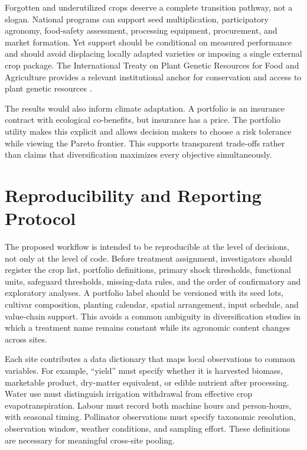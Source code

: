 \documentclass[conference]{IEEEtran}
\begin{document}
Forgotten and underutilized crops deserve a complete transition pathway, not a slogan. National programs can support seed multiplication, participatory agronomy, food-safety assessment, processing equipment, procurement, and market formation. Yet support should be conditional on measured performance and should avoid displacing locally adapted varieties or imposing a single external crop package. The International Treaty on Plant Genetic Resources for Food and Agriculture provides a relevant institutional anchor for conservation and access to plant genetic resources \cite{fao_treaty}.

The results would also inform climate adaptation. A portfolio is an insurance contract with ecological co-benefits, but insurance has a price. The portfolio utility makes this explicit and allows decision makers to choose a risk tolerance while viewing the Pareto frontier. This supports transparent trade-offs rather than claims that diversification maximizes every objective simultaneously.

\section{Reproducibility and Reporting Protocol}
\label{sec:repro}
The proposed workflow is intended to be reproducible at the level of decisions, not only at the level of code. Before treatment assignment, investigators should register the crop list, portfolio definitions, primary shock thresholds, functional units, safeguard thresholds, missing-data rules, and the order of confirmatory and exploratory analyses. A portfolio label should be versioned with its seed lots, cultivar composition, planting calendar, spatial arrangement, input schedule, and value-chain support. This avoids a common ambiguity in diversification studies in which a treatment name remains constant while its agronomic content changes across sites.

Each site contributes a data dictionary that maps local observations to common variables. For example, ``yield'' must specify whether it is harvested biomass, marketable product, dry-matter equivalent, or edible nutrient after processing. Water use must distinguish irrigation withdrawal from effective crop evapotranspiration. Labour must record both machine hours and person-hours, with seasonal timing. Pollinator observations must specify taxonomic resolution, observation window, weather conditions, and sampling effort. These definitions are necessary for meaningful cross-site pooling.
\end{document}
